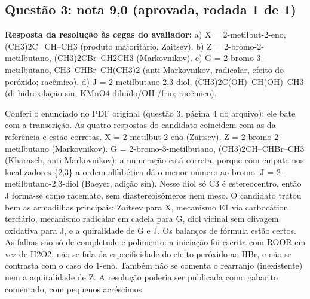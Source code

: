 \documentclass{article}%
\begin{document}
\subsection*{Questão 3: nota 9,0 (aprovada, rodada 1 de 1)}%
\textbf{Resposta da resolução às cegas do avaliador:} a) X = 2{-}metilbut{-}2{-}eno, (CH3)2C=CH--CH3 (produto majoritário, Zaitsev).\newline%
b) Z = 2{-}bromo{-}2{-}metilbutano, (CH3)2CBr--CH2CH3 (Markovnikov).\newline%
c) G = 2{-}bromo{-}3{-}metilbutano, CH3--CHBr--CH(CH3)2 (anti{-}Markovnikov, radicalar, efeito do peróxido; racêmico).\newline%
d) J = 2{-}metilbutano{-}2,3{-}diol, (CH3)2C(OH)--CH(OH)--CH3 (di{-}hidroxilação sin, KMnO4 diluído/OH{-}/frio; racêmico).\par %
Conferi o enunciado no PDF original (questão 3, página 4 do arquivo): ele bate com a transcrição. As quatro respostas do candidato coincidem com as da referência e estão corretas. X = 2{-}metilbut{-}2{-}eno (Zaitsev). Z = 2{-}bromo{-}2{-}metilbutano (Markovnikov). G = 2{-}bromo{-}3{-}metilbutano, (CH3)2CH--CHBr--CH3 (Kharasch, anti{-}Markovnikov); a numeração está correta, porque com empate nos localizadores \{2,3\} a ordem alfabética dá o menor número ao bromo. J = 2{-}metilbutano{-}2,3{-}diol (Baeyer, adição sin). Nesse diol só C3 é estereocentro, então J forma{-}se como racemato, sem diastereoisômeros nem meso. O candidato tratou bem as armadilhas principais: Zaitsev para X, mecanismo E1 via carbocátion terciário, mecanismo radicalar em cadeia para G, diol vicinal sem clivagem oxidativa para J, e a quiralidade de G e J. Os balanços de fórmula estão certos. As falhas são só de completude e polimento: a iniciação foi escrita com ROOR em vez de H2O2, não se fala da especificidade do efeito peróxido ao HBr, e não se contrasta com o caso do 1{-}eno. Também não se comenta o rearranjo (inexistente) nem a aquiralidade de Z. A resolução poderia ser publicada como gabarito comentado, com pequenos acréscimos.%
\end{document}
